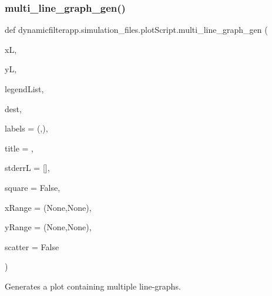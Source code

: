 \subsubsection{\texorpdfstring{multi\+\_\+line\+\_\+graph\+\_\+gen()}{multi\_line\_graph\_gen()}}
{\footnotesize\ttfamily def dynamicfilterapp.\+simulation\+\_\+files.\+plot\+Script.\+multi\+\_\+line\+\_\+graph\+\_\+gen (\begin{DoxyParamCaption}\item[{}]{xL,  }\item[{}]{yL,  }\item[{}]{legend\+List,  }\item[{}]{dest,  }\item[{}]{labels = {\ttfamily (\textquotesingle{}\textquotesingle{},\textquotesingle{}\textquotesingle{})},  }\item[{}]{title = {\ttfamily \textquotesingle{}\textquotesingle{}},  }\item[{}]{stderrL = {\ttfamily \mbox{[}\mbox{]}},  }\item[{}]{square = {\ttfamily False},  }\item[{}]{x\+Range = {\ttfamily (None,None)},  }\item[{}]{y\+Range = {\ttfamily (None,None)},  }\item[{}]{scatter = {\ttfamily False} }\end{DoxyParamCaption})}



Generates a plot containing multiple line-\/graphs. 


